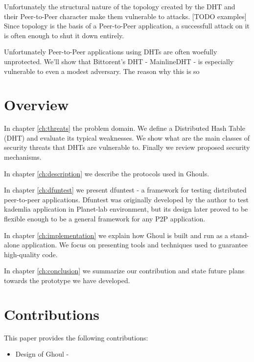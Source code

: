 Unfortunately the structural nature of the topology created by the DHT and their
Peer-to-Peer character make them vulnerable to attacks.
[TODO examples]
Since topology is the basis of a Peer-to-Peer application, a successfull attack
on it is often enough to shut it down entirely.

Unfortunately Peer-to-Peer applications using DHTs are often woefully
unprotected.
We'll show that Bittorent's DHT - MainlineDHT - is especially vulnerable to even
a modest adversary.
The reason why this is so 



\section{Overview}
In chapter \ref{ch:threats} the problem domain.
We define a Distributed Hash Table (DHT) and evaluate its typical weaknesses.
We show what are the main classes of security threats that DHTs are vulnerable to.
Finally we review proposed security mechanisms.

In chapter \ref{ch:description} we describe the protocols used in Ghouls.

In chapter \ref{ch:dfuntest} we present dfuntest - a framework for testing distributed peer-to-peer applications.
Dfuntest was originally developed by the author to test kademlia application in Planet-lab environment, but its design later proved to be flexible enough to be a general framework for any P2P application.

In chapter \ref{ch:implementation} we explain how Ghoul is built and run as a stand-alone application.
We focus on presenting tools and techniques used to guarantee high-quality code.

In chapter \ref{ch:conclusion} we summarize our contribution and state future plans towards the prototype we have developed.

\section{Contributions}
This paper provides the following contributions:
\begin{itemize}
  \item Design of Ghoul - 
\end{itemize}
